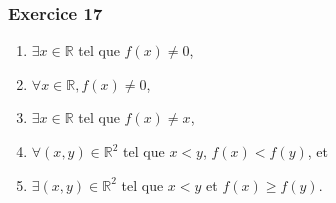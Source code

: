 \documentclass[10pt,notheorems]{beamer}
\theoremstyle{plain}
\theoremstyle{definition} %
\begin{document}
\begin{frame}
  \frametitle{Exercice 17}
  \fontsize{8}{10}\selectfont

  \begin{enumerate}
  \item $\exists x\in\mathbb R$ tel que $f(x)\neq 0$,\newline
  \item $\forall x\in\mathbb R, f(x)\neq 0$,\newline
  \item $\exists x\in\mathbb R$ tel que $f(x)\neq x$,\newline
  \item $\forall (x,y)\in\mathbb R^2$ tel que $x<y$, $f(x)<f(y)$, et\newline
  \item $\exists (x,y)\in\mathbb R^2$ tel que $x<y$ et $f(x)\geq f(y)$.
  \end{enumerate}

\end{frame}
\end{document}
